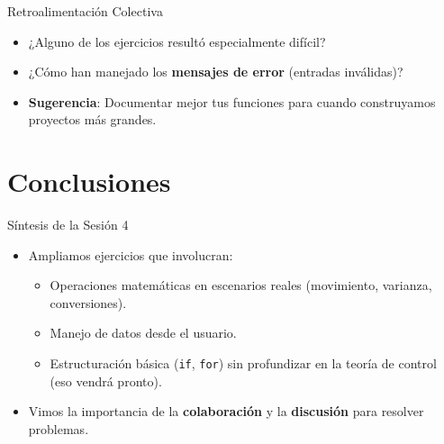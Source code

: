 \documentclass[10pt]{beamer}
\begin{document}
\begin{frame}{Retroalimentación Colectiva}
  \begin{itemize}
    \item ¿Alguno de los ejercicios resultó especialmente difícil?
    \item ¿Cómo han manejado los \textbf{mensajes de error} (entradas inválidas)?
    \item \textbf{Sugerencia}: Documentar mejor tus funciones para cuando construyamos proyectos más grandes.
  \end{itemize}
\end{frame}

\section{Conclusiones}

\begin{frame}{Síntesis de la Sesión 4}
  \begin{itemize}
    \item Ampliamos ejercicios que involucran:
      \begin{itemize}
        \item Operaciones matemáticas en escenarios reales (movimiento, varianza, conversiones).
        \item Manejo de datos desde el usuario.
        \item Estructuración básica (\texttt{if}, \texttt{for}) sin profundizar en la teoría de control (eso vendrá pronto).
      \end{itemize}
    \item Vimos la importancia de la \textbf{colaboración} y la \textbf{discusión} para resolver problemas.
  \end{itemize}
\end{frame}
\end{document}
